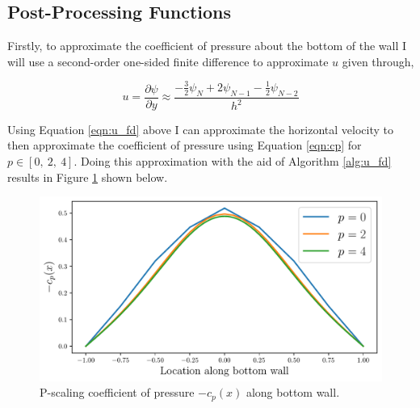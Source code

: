 \pagebreak
\subsection{Post-Processing Functions}

Firstly, to approximate the coefficient of pressure about the bottom of the wall I will use a second-order one-sided finite difference to approximate $u$ given through,

\begin{equation}
    u = \frac{\partial \psi}{\partial y} \approx \frac{-\frac{3}{2}\psi_{N} + 2\psi_{N-1} - \frac{1}{2}\psi_{N-2}}{h^2}
    \label{eqn:u_fd}
\end{equation}

Using Equation \ref{eqn:u_fd} above I can approximate the horizontal velocity to then approximate the coefficient of pressure using Equation \ref{eqn:cp} for $p \in [0,\ 2,\ 4]$. Doing this approximation with the aid of Algorithm \ref{alg:u_fd} results in Figure \ref{fig:cp_runs} shown below.

\begin{figure}[h]
    \centering
    \includegraphics[width = 0.9\linewidth]{tasks/figs/cp_runs.pdf}
    \caption[Coefficient of Pressure Along Bottom Wall.]{P-scaling coefficient of pressure $-c_p(x)$ along bottom wall.}
    \label{fig:cp_runs}
\end{figure}

